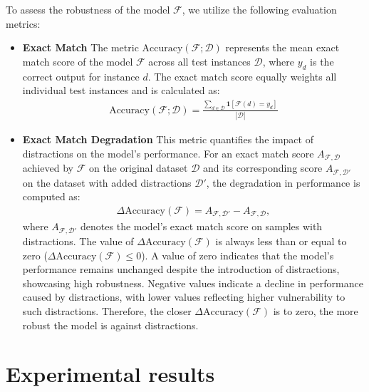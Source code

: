 To assess the robustness of the model $\mathcal{F}$, we utilize the following evaluation metrics:

\begin{itemize}[leftmargin=*, itemsep=0pt, topsep=0pt, parsep=2pt, partopsep=0pt]
    \item \textbf{Exact Match} The metric $\mathrm{Accuracy}(\mathcal{F}; \mathcal{D})$ represents the mean exact match score of the model $\mathcal{F}$ across all test instances $\mathcal{D}$, where $y_d$ is the correct output for instance $d$. The exact match score equally weights all individual test instances and is calculated as:
    \begin{align*}
        \mathrm{Accuracy}(\mathcal{F}; \mathcal{D}) = 
            \frac{
                \sum_{d \in \mathcal{D}} 
                    \mathbf{1}\left[
                        \mathcal{F}(d) = y_d
                    \right]
            }{
                |\mathcal{D}|
            }
    \end{align*}
    
    \item \textbf{Exact Match Degradation} This metric quantifies the impact of distractions on the model's performance. For an exact match score $A_{\mathcal{F}, \mathcal{D}}$ achieved by $\mathcal{F}$ on the original dataset $\mathcal{D}$ and its corresponding score $A_{\mathcal{F}, \mathcal{D}'}$ on the dataset with added distractions $\mathcal{D}'$, the degradation in performance is computed as:
    \begin{align*}
        \Delta \mathrm{Accuracy}(\mathcal{F}) = A_{\mathcal{F}, \mathcal{D}'} - A_{\mathcal{F}, \mathcal{D}},
    \end{align*}
        where $A_{\mathcal{F}, \mathcal{D}'}$ denotes the model's exact match score on samples with distractions. The value of $\Delta \mathrm{Accuracy}(\mathcal{F})$ is always less than or equal to zero ($\Delta \mathrm{Accuracy}(\mathcal{F}) \leq 0$). A value of zero indicates that the model's performance remains unchanged despite the introduction of distractions, showcasing high robustness. Negative values indicate a decline in performance caused by distractions, with lower values reflecting higher vulnerability to such distractions. Therefore, the closer $\Delta \mathrm{Accuracy}(\mathcal{F})$ is to zero, the more robust the model is against distractions.
\end{itemize}


\section{Experimental results}
 
